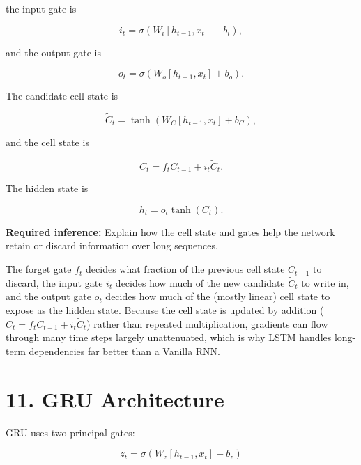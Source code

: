 \documentclass[10pt]{article}
\begin{document}
the input gate is

\[
i_t=\sigma(W_i[h_{t-1},x_t]+b_i),
\]

and the output gate is

\[
o_t=\sigma(W_o[h_{t-1},x_t]+b_o).
\]

The candidate cell state is

\[
\tilde{C}_t=
\tanh(W_C[h_{t-1},x_t]+b_C),
\]

and the cell state is

\[
C_t=f_tC_{t-1}+i_t\tilde{C}_t.
\]

The hidden state is

\[
h_t=o_t\tanh(C_t).
\]

\begin{center}
\end{center}

\textbf{Required inference:} Explain how the cell state and gates help the
network retain or discard information over long sequences.

The forget gate $f_t$ decides what fraction of the previous cell state
$C_{t-1}$ to discard, the input gate $i_t$ decides how much of the new
candidate $\tilde{C}_t$ to write in, and the output gate $o_t$ decides how
much of the (mostly linear) cell state to expose as the hidden state.
Because the cell state is updated by addition ($C_t=f_tC_{t-1}+i_t\tilde{C}_t$)
rather than repeated multiplication, gradients can flow through many time
steps largely unattenuated, which is why LSTM handles long-term dependencies
far better than a Vanilla RNN.

\section*{11. GRU Architecture}

GRU uses two principal gates:

\[
z_t=\sigma(W_z[h_{t-1},x_t]+b_z)
\]
\end{document}
